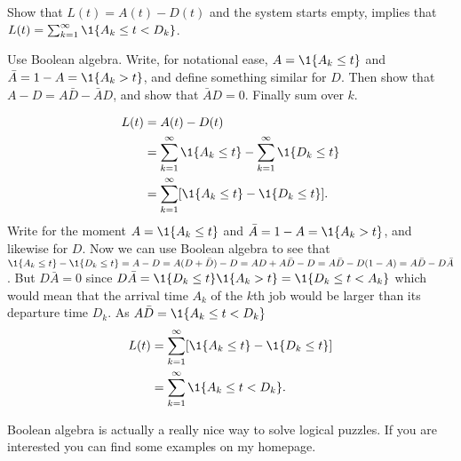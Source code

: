 \begin{exercise} Show that $L(t) = A(t)-D(t)$ and the system starts empty, implies that 
$L(t) = \sum_{k=1}^\infty \1{A_k \leq t < D_k}$.
  \begin{hint}
  Use Boolean algebra.  Write, for notational ease,
    $A=\1{A_k \leq t}$ and $\bar A = 1- A = \1{A_k > t}$, and define
    something similar for $D$.  Then show that
    $A - D = A \bar D - \bar A D$, and show that $\bar A D
    =0$. Finally sum over $k$.
  \end{hint}

\begin{solution}
  \begin{equation*}
    \begin{split}
      L(t)
&= A(t) - D(t) \\
&= \sum_{k=1}^\infty \1{A_k \leq t} -  \sum_{k=1}^\infty \1{D_k \leq t} \\
&= \sum_{k=1}^\infty [\1{A_k \leq t} -  \1{D_k \leq t}].
    \end{split}
  \end{equation*}
  Write for the moment $A=\1{A_k \leq t}$ and
  $\bar A = 1- A = \1{A_k > t}$, and likewise for $D$. Now we can use
  Boolean algebra to see that
  $\1{A_k \leq t} - \1{D_k \leq t} = A-D = A(D+\bar D) -D = AD +
  A\bar D - D = A\bar D - D(1-A) = A\bar D - D \bar A$.
  But $D \bar A = 0$ since
  $D \bar A = \1{D_k \leq t} \1{A_k > t} = \1{D_k \leq t < A_k}$
  which would mean that the arrival time $A_k$ of the $k$th job would
  be larger than its departure time $D_k$. As $A \bar D = \1{A_k \leq t < D_k}$
  \begin{equation*}
    \begin{split}
      L(t)
&= \sum_{k=1}^\infty [\1{A_k \leq t} -  \1{D_k \leq t}] \\
&= \sum_{k=1}^\infty \1{A_k \leq t < D_k}.
    \end{split}
  \end{equation*}

  Boolean algebra is actually a really nice way to solve logical
  puzzles. If you are interested you can find some examples on my
  homepage. 
\end{solution}

\end{exercise}

